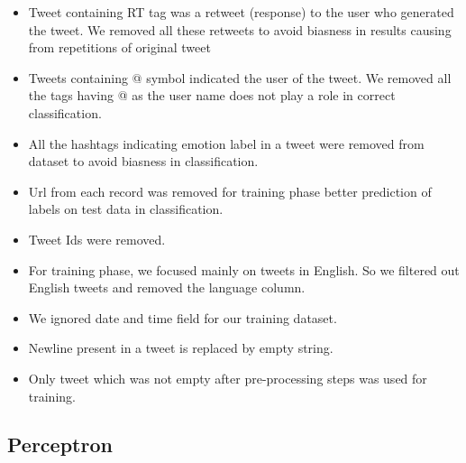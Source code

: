\documentclass[11pt]{article}
\begin{document}
  \begin{itemize}
  \item Tweet containing RT tag was a retweet (response) to the user who generated the tweet. We removed all these retweets to avoid biasness in results causing from repetitions of original tweet
  \item Tweets containing @ symbol indicated the user of the tweet. We removed all the tags having @ as the user name does not play a role in correct classification.
  \item All the hashtags indicating emotion label in a tweet were removed from dataset to avoid biasness in classification.
  \item Url from each record was removed for training phase better prediction of labels on test data in classification.
  \item Tweet Ids were removed.
  \item For training phase, we focused mainly on tweets in English. So we filtered out English tweets and removed the language column.
  \item We ignored date and time field for our training dataset.
  \item   Newline present in a tweet is replaced by empty string.
  \item   Only tweet which was not empty after pre-processing steps was used for training.
  \end{itemize}
  
  
  \subsection{Perceptron}
  
\end{document}
